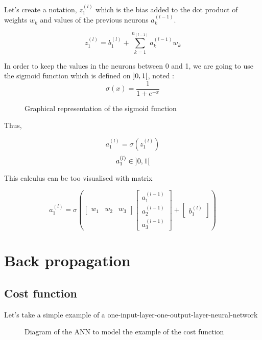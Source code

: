 \documentclass[]{report}
\begin{document}
{Let's create a notation, $z^{(l)}_1$ which is the bias added to the dot product of weights $w_k$ and values of the previous neurons $a^{(l-1)}_k$.}

\[{z^{(l)}_1=b^{(l)}_1+\sum_{k=1}^{n_{(l-1)}} a^{(l-1)}_k w_k}\]

{In order to keep the values in the neurons between 0 and 1, we are going to use the sigmoid function which is defined on $\interval[open]{0}{1}$, noted :}
\[\sigma(x)=\frac{1}{1+e^{-x}}\]

\begin{figure}[H]
    \centering
    \caption{Graphical representation of the sigmoid function}
\end{figure}

{Thus,}

\[a^{(l)}_1=\sigma\left(z^{(l)}_1\right)\]
\[a^{(l)}_1 \in \interval[open]{0}{1}\]

{This calculus can be too visualised with matrix}

\[a^{(l)}_1=\sigma\left(\begin{bmatrix}w_1 & w_2 & w_3\end{bmatrix}\begin{bmatrix}a^{(l-1)}_1 \\ a^{(l-1)}_2 \\ a^{(l-1)}_3\end{bmatrix}+\begin{bmatrix}b^{(l)}_1\end{bmatrix}\right)\]

\section{Back propagation}

\subsection{Cost function}

{Let's take a simple example of a one-input-layer-one-output-layer-neural-network}

\begin{figure}[H]
    \centering
    \begin{neuralnetwork}[height=2, nodespacing=15mm]
        \newcommand{\inputtext}[2]{$a^{(l-1)}$}
        \newcommand{\outputtext}[2]{$a^{(l)}$}
        \inputlayer[count=1, bias=false, text=\inputtext, title=Input layer]
        \outputlayer[count=1,  text=\outputtext, title=Output layer]
        \linklayers[title=Weight $w$]
    \end{neuralnetwork}
    \caption{Diagram of the ANN to model the example of the cost function}
    \label{fig:simplenn}
\end{figure}
\end{document}
